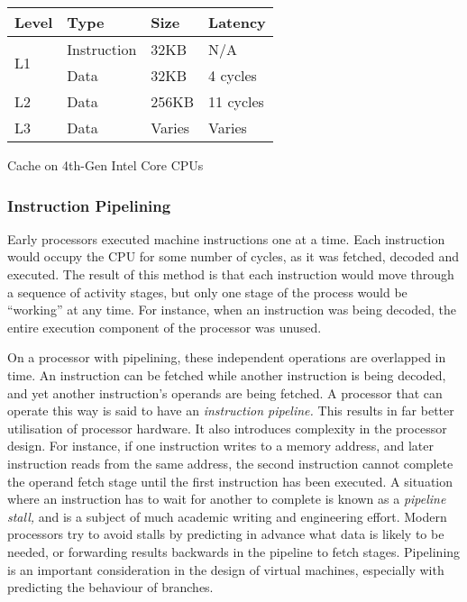 			\begin{myfigure}
				\begin{tabular}{ | l | l | l | l | }
					\hline
					Level & Type & Size & Latency \\ 
					\hline
					\multirow{2}{*}{L1} & Instruction & 32KB & N/A \\
					& Data & 32KB & 4 cycles \\
					\hline
					L2 & Data & 256KB & 11 cycles \\
					\hline
					L3 & Data & Varies & Varies \\
					\hline
				\end{tabular}
				\caption{Cache on 4th-Gen Intel Core CPUs \citep{optimisationreference}}
				\label{fig:cachenumbers}
			\end{myfigure}
			
			\subsubsection{Instruction Pipelining}
			Early processors executed machine instructions one at a time. Each instruction would occupy the CPU for some number of cycles, as it was fetched, decoded and executed. The result of this method is that each instruction would move through a sequence of activity stages, but only one stage of the process would be ``working'' at any time. For instance, when an instruction was being decoded, the entire execution component of the processor was unused.
			
			On a processor with pipelining, these independent operations are overlapped in time. An instruction can be fetched while another instruction is being decoded, and yet another instruction's operands are being fetched. A processor that can operate this way is said to have an \emph{instruction pipeline.} This results in far better utilisation of processor hardware. It also introduces complexity in the processor design. For instance, if one instruction writes to a memory address, and later instruction reads from the same address, the second instruction cannot complete the operand fetch stage until the first instruction has been executed. A situation where an instruction has to wait for another to complete is known as a \emph{pipeline stall,} and is a subject of much academic writing and engineering effort. Modern processors try to avoid stalls by predicting in advance what data is likely to be needed, or forwarding results backwards in the pipeline to fetch stages. Pipelining is an important consideration in the design of virtual machines, especially with predicting the behaviour of branches.
			
